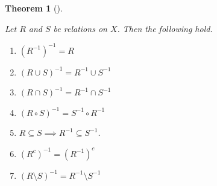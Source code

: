 \documentclass[
  letterpaper,
  10pt,
  reqno,
  twopage,
  openany]{book}
\providecommand{\tightlist}{%
  \setlength{\itemsep}{0pt}\setlength{\parskip}{0pt}}\usepackage{longtable,booktabs,array}
\theoremstyle{plain}
\theoremstyle{definition}
\theoremstyle{definition}
\theoremstyle{definition}
\theoremstyle{plain}
\theoremstyle{plain}
\newtheorem{theorem}{Theorem}[chapter]
\theoremstyle{remark}
\begin{document}
\leavevmode{}%
\begin{theorem}[]\label{thm-relations-image-preimage}

Let \(R\) and \(S\) be relations on \(X\). Then the following hold.

\begin{enumerate}
\def\labelenumi{\arabic{enumi}.}
\tightlist
\item
  \((R^{-1})^{-1}=R\)
\item
  \((R\cup S)^{-1}=R^{-1}\cup S^{-1}\)
\item
  \((R\cap S)^{-1}=R^{-1}\cap S^{-1}\)
\item
  \((R\circ S)^{-1}=S^{-1}\circ R^{-1}\)
\item
  \(R\subseteq S \implies R^{-1}\subseteq S^{-1}\).
\item
  \((R^c)^{-1}=(R^{-1})^c\)
\item
  \((R\setminus S)^{-1}=R^{-1}\setminus S^{-1}\)
\end{enumerate}

\end{theorem}
\end{document}
